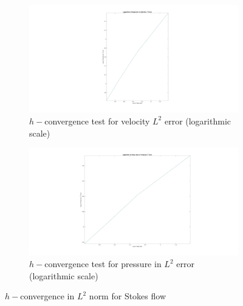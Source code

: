 \documentclass[a4paper,openany]{book}
\begin{document}
\begin{figure}
\begin{subfigure}{\textwidth}	
  \includegraphics[width=\linewidth]{l2_velocity_log_stokes.jpg}
  \caption{$h-$convergence test for velocity $L^2$ error (logarithmic scale)}
  \label{fig:vel_stoke_conv_log}
\end{subfigure}
\begin{subfigure}{\textwidth}	
  \includegraphics[width=\linewidth]{l2_pressure_log_stokes.jpg}
  \caption{$h-$convergence test for pressure in $L^2$ error (logarithmic scale)}
  \label{fig:pre_stoke_conv_log}
\end{subfigure}
\caption{$h-$convergence in $L^2$ norm for Stokes flow}
\label{fig:l2_stokes}
\end{figure}
\end{document}
